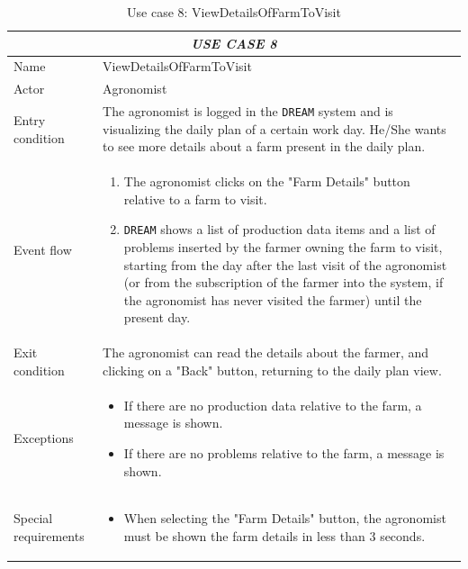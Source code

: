 \documentclass{article}
\begin{document}
\centering
\begin{longtable}{|p{3.5cm}|m{8cm}|}
\caption{Use case 8: ViewDetailsOfFarmToVisit}
 \label{uc8}
 \hline
 \multicolumn{2}{|c|}{\cellcolor{white}\emph{USE CASE 8}} \\
 \endfirsthead
 \endhead
 \endfoot
 \endlastfoot
 \hline
 Name & ViewDetailsOfFarmToVisit\\
 \hline
 Actor & Agronomist\\
 \hline
 Entry condition & The agronomist is logged in the \verb|DREAM| system and is visualizing the daily plan of a certain work day. He/She wants to see more details about a farm present in the daily plan.\\
 \hline
 Event flow & \begin{enumerate}
    \item The agronomist clicks on the "Farm Details" button relative to a farm to visit.
    \item \verb|DREAM| shows a list of production data items and a list of problems inserted by the farmer owning the farm to visit, starting from the day after the last visit of the agronomist (or from the subscription of the farmer into the system, if the agronomist has never visited the farmer) until the present day.
 \end{enumerate}\\
 \hline
 Exit condition & The agronomist can read the details about the farmer, and clicking on a "Back" button, returning to the daily plan view.\\
 \hline
 Exceptions & \begin{itemize}
     \item If there are no production data relative to the farm, a message is shown.
     \item If there are no problems relative to the farm, a message is shown.
 \end{itemize}\\
 \hline
 Special requirements &\begin{itemize}
     \item When selecting the "Farm Details" button, the agronomist must be shown the farm details in less than 3 seconds.
 \end{itemize}\\
 \hline
\end{longtable}
\end{document}
